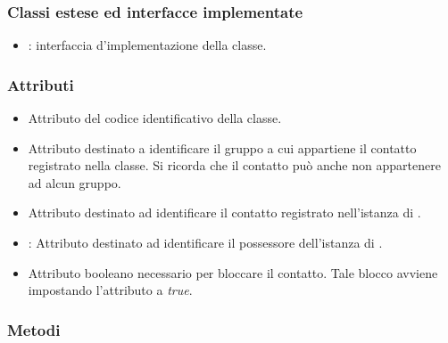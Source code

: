 \subsubsection*{Classi estese ed interfacce implementate}
\begin{itemize}
	\item {}: interfaccia d'implementazione della classe.
\end{itemize}

\subsubsection*{Attributi}

\begin{itemize}
	\item{}
	Attributo del codice identificativo della classe.
	\item{}
	Attributo destinato a identificare il gruppo a cui appartiene il contatto  registrato nella classe. Si ricorda che il contatto può anche non appartenere ad alcun gruppo.
	\item{}
	Attributo destinato ad identificare il contatto registrato nell'istanza di .
	\item{}:
	Attributo destinato ad identificare il possessore dell'istanza di .
	\item{}
	Attributo booleano necessario per bloccare il contatto. Tale blocco avviene impostando l'attributo a \textit{true}.
\end{itemize}


\subsubsection*{Metodi}


